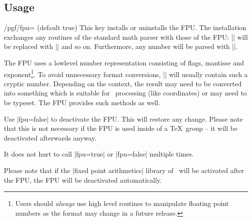 \subsection{Usage}
\begin{key}{/pgf/fpu= (default true)}
	This key installs or uninstalls the FPU. The installation exchanges any routines of the standard math parser with those of the FPU: |\pgfmathadd| will be replaced with |\pgfmathfloatadd| and so on. Furthermore, any number will be parsed with |\pgfmathfloatparsenumber|.

\begin{codeexample}[]
\pgfmathresult
\end{codeexample}
\noindent The FPU uses a lowlevel number representation consisting of flags, mantisse and exponent\footnote{Users should \emph{always} use high level routines to manipulate floating point numbers as the format may change in a future release.}. To avoid unnecessary format conversions, |\pgfmathresult| will usually contain such a cryptic number. Depending on the context, the result may need to be converted into something which is suitable for \pgfname\ processing (like coordinates) or may need to be typeset. The FPU provides such methods as well.


	Use |fpu=false| to deactivate the FPU. This will restore any change. Please note that this is not necessary if the FPU is used inside of a \TeX\ group -- it will be deactivated afterwards anyway.

	It does not hurt to call |fpu=true| or |fpu=false| multiple times.

	Please note that if the |fixed point arithmetics| library of \pgfname\ will be activated after the FPU, the FPU will be deactivated automatically.
\end{key}

